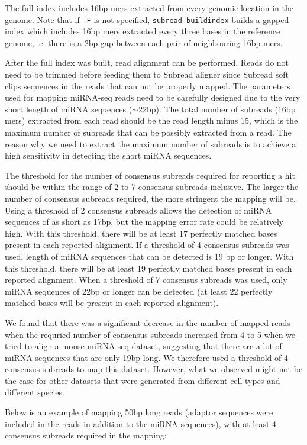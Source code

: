 \documentclass[12pt]{report}
\newcommand{\code}[1]{{\small\texttt{#1}}}
\newcommand{\Subread}{\textsf{Subread}}
\begin{document}
The full index includes 16bp mers extracted from every genomic location in the genome.
Note that if \code{-F} is not specified, \code{subread-buildindex} builds a gapped index which includes 16bp mers extracted every three bases in the reference genome, ie. there is a 2bp gap between each pair of neighbouring 16bp mers.

After the full index was built, read alignment can be performed.
Reads do not need to be trimmed before feeding them to {\Subread} aligner since {\Subread} soft clips sequences in the reads that can not be properly mapped.
The parameters used for mapping miRNA-seq reads need to be carefully designed due to the very short length of miRNA sequences ($\sim$22bp).
The total number of subreads (16bp mers) extracted from each read should be the read length minus 15, which
is the maximum number of subreads that can be possibly extracted from a read.
The reason why we need to extract the maximum number of subreads is to achieve a high sensitivity in detecting the short miRNA sequences.

The threshold for the number of consensus subreads required for reporting a hit should be within the range of 2 to 7 consensus subreads inclusive.
The larger the number of consensus subreads required, the more stringent the mapping will be.
Using a threshold of 2 consensus subreads allows the detection of miRNA sequences of as short as 17bp, but the mapping error rate could be relatively high.
With this threshold, there will be at least 17 perfectly matched bases present in each reported alignment.
If a threshold of 4 consensus subreads was used, length of miRNA sequences that can be detected is 19 bp or longer.
With this threshold, there will be at least 19 perfectly matched bases present in each reported alignment.
When a threshold of 7 consensus subreads was used, only miRNA sequences of 22bp or longer can be detected (at least 22 perfectly matched bases will be present in each reported alignment).

We found that there was a significant decrease in the number of mapped reads when the requried number of consensus subreads increased from 4 to 5 when we tried to align a mouse miRNA-seq dataset, suggesting that there are a lot of miRNA sequences that are only 19bp long.
We therefore used a threshold of 4 consensus subreads to map this dataset.
However, what we observed might not be the case for other datasets that were generated from different cell types and different species.

Below is an example of mapping 50bp long reads (adaptor sequences were included in the reads in addition to the miRNA sequences), with at least 4 consensus subreads required in the mapping:
\end{document}
